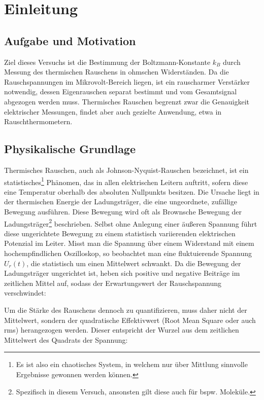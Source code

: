 \chapter{Einleitung} \label{ch:Einleitung}

\section{Aufgabe und Motivation}
\label{sec:AuM}

Ziel dieses Versuchs ist die Bestimmung der Boltzmann-Konstante $k_B$ durch Messung des thermischen Rauschens in ohmschen Widerständen. Da die Rauschspannungen im Mikrovolt-Bereich liegen, ist ein rauscharmer Verstärker notwendig, dessen Eigenrauschen separat bestimmt und vom Gesamtsignal abgezogen werden muss. Thermisches Rauschen begrenzt zwar die Genauigkeit elektrischer Messungen, findet aber auch gezielte Anwendung, etwa in Rauschthermometern.

\section{Physikalische Grundlage}
\label{sec:PhyBasics}

Thermisches Rauschen, auch als Johnson-Nyquist-Rauschen bezeichnet, ist ein statistisches\footnote{Es ist also ein chaotisches System, in welchem nur über Mittlung sinnvolle Ergebnisse gewonnen werden können.} Phänomen, das in allen elektrischen Leitern auftritt, sofern diese eine Temperatur oberhalb des absoluten Nullpunkts besitzen. Die Ursache liegt in der thermischen Energie der Ladungsträger, die eine ungeordnete, zufällige Bewegung ausführen. Diese Bewegung wird oft als Brownsche Bewegung der Ladungsträger\footnote{Spezifisch in diesem Versuch, ansonsten gilt diese auch für bspw. Moleküle.} beschrieben. Selbst ohne Anlegung einer äußeren Spannung führt diese ungerichtete Bewegung zu einem statistisch variierenden elektrischen Potenzial im Leiter. Misst man die Spannung über einem Widerstand mit einem hochempfindlichen Oszilloskop, so beobachtet man eine fluktuierende Spannung $U_r(t)$, die statistisch um einen Mittelwert schwankt. Da die Bewegung der Ladungsträger ungerichtet ist, heben sich positive und negative Beiträge im zeitlichen Mittel auf, sodass der Erwartungswert der Rauschspannung verschwindet:


Um die Stärke des Rauschens dennoch zu quantifizieren, muss daher nicht der Mittelwert, sondern der quadratische Effektivwert (Root Mean Square oder auch rms) herangezogen werden. Dieser entspricht der Wurzel aus dem zeitlichen Mittelwert des Quadrats der Spannung:

